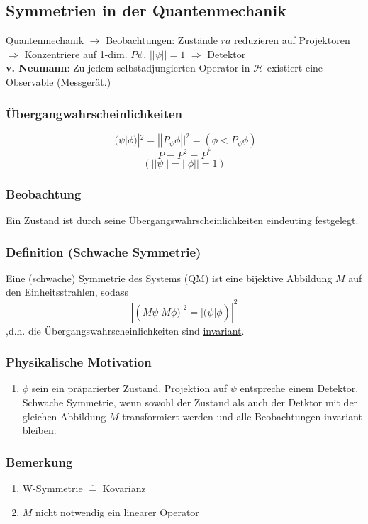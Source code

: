 \documentclass[twoside,a4paper]{scrartcl}
\renewcommand{\1}{\mathds{1}}
\newcommand{\Ra}{\Rightarrow}
\newcommand{\ra}{\rightarrow}
\renewcommand{\H}{\mathcal{H}}
\begin{document}
\subsection{Symmetrien in der Quantenmechanik}
Quantenmechanik $\ra$ Beobachtungen: Zustände $ra$ reduzieren auf Projektoren\\
$\Ra$ Konzentriere auf 1-dim. $P\psi$, $||\psi||=1$ $\Ra$ Detektor\\
\textbf{v. Neumann}: Zu jedem selbstadjungierten Operator in $\H$ existiert eine Observable (Messgerät.)\\
\subsubsection*{Übergangwahrscheinlichkeiten}
$$|(\psi|\phi)|^2=||P_\psi \phi||^2=(\phi<P_\psi\phi)$$
$$P=P^2=P^*$$
$$(||\psi||=||\phi||=1)$$
\subsubsection*{Beobachtung}
Ein Zustand ist durch seine Übergangswahrscheinlichkeiten \underline{eindeuting} festgelegt.
\subsubsection*{Definition (Schwache Symmetrie)}
Eine (schwache) Symmetrie des Systems (QM) ist eine bijektive Abbildung $M$ auf den Einheitsstrahlen, sodass
$$|(M\psi|M\phi)|^2=|(\psi|\phi)|^2$$
,d.h. die Übergangswahrscheinlichkeiten sind \underline{invariant}.
\subsubsection*{Physikalische Motivation}
\begin{enumerate}
\item $\phi$ sein ein präparierter Zustand, Projektion auf $\psi$ entspreche einem Detektor.\\
Schwache Symmetrie, wenn sowohl der Zustand als auch der Detktor mit der gleichen Abbildung $M$ transformiert werden und alle Beobachtungen invariant bleiben.
\end{enumerate}
\subsubsection*{Bemerkung}
\begin{enumerate}
\item W-Symmetrie $\mathrel{\widehat{=}}$ Kovarianz
\item $M$ nicht notwendig ein linearer Operator
\end{enumerate}
\end{document}
